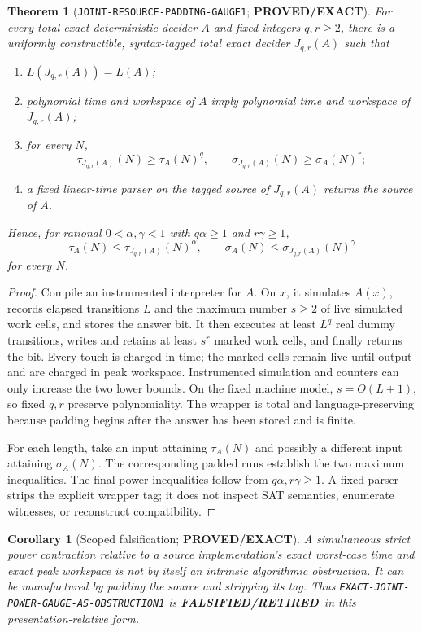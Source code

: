 \documentclass[11pt]{article}
\newtheorem{theorem}{Theorem}
\newtheorem{corollary}{Corollary}
\newcommand{\EXACT}{\textbf{PROVED/EXACT}}
\newcommand{\RETIRED}{\textbf{FALSIFIED/RETIRED}}
\begin{document}
\begin{theorem}[\texttt{JOINT-RESOURCE-PADDING-GAUGE1}; \EXACT]
For every total exact deterministic decider $A$ and fixed integers $q,r\ge2$,
there is a uniformly constructible, syntax-tagged total exact decider
$J_{q,r}(A)$ such that
\begin{enumerate}[label=(\roman*)]
\item $L(J_{q,r}(A))=L(A)$;
\item polynomial time and workspace of $A$ imply polynomial time and workspace
      of $J_{q,r}(A)$;
\item for every $N$,
\[
 \tau_{J_{q,r}(A)}(N)\ge\tau_A(N)^q,
 \qquad
 \sigma_{J_{q,r}(A)}(N)\ge\sigma_A(N)^r;
\]
\item a fixed linear-time parser on the tagged source of $J_{q,r}(A)$ returns
      the source of $A$.
\end{enumerate}
Hence, for rational $0<\alpha,\gamma<1$ with $q\alpha\ge1$ and
$r\gamma\ge1$,
\[
 \tau_A(N)\le\tau_{J_{q,r}(A)}(N)^\alpha,
 \qquad
 \sigma_A(N)\le\sigma_{J_{q,r}(A)}(N)^\gamma
\]
for every $N$.
\end{theorem}

\begin{proof}
Compile an instrumented interpreter for $A$.  On $x$, it simulates $A(x)$,
records elapsed transitions $L$ and the maximum number $s\ge2$ of live
simulated work cells, and stores the answer bit.  It then executes at least
$L^q$ real dummy transitions, writes and retains at least $s^r$ marked work
cells, and finally returns the bit.  Every touch is charged in time; the marked
cells remain live until output and are charged in peak workspace.  Instrumented
simulation and counters can only increase the two lower bounds.  On the fixed
machine model, $s=O(L+1)$, so fixed $q,r$ preserve polynomiality.  The wrapper
is total and language-preserving because padding begins after the answer has
been stored and is finite.

For each length, take an input attaining $\tau_A(N)$ and possibly a different
input attaining $\sigma_A(N)$.  The corresponding padded runs establish the
two maximum inequalities.  The final power inequalities follow from
$q\alpha,r\gamma\ge1$.  A fixed parser strips the explicit wrapper tag; it does
not inspect SAT semantics, enumerate witnesses, or reconstruct compatibility.
\end{proof}

\begin{corollary}[Scoped falsification; \EXACT]
A simultaneous strict power contraction relative to a source implementation's
exact worst-case time and exact peak workspace is not by itself an intrinsic
algorithmic obstruction.  It can be manufactured by padding the source and
stripping its tag.  Thus
\texttt{EXACT-JOINT-POWER-GAUGE-AS-OBSTRUCTION1} is \RETIRED\ in this
presentation-relative form.
\end{corollary}
\end{document}
